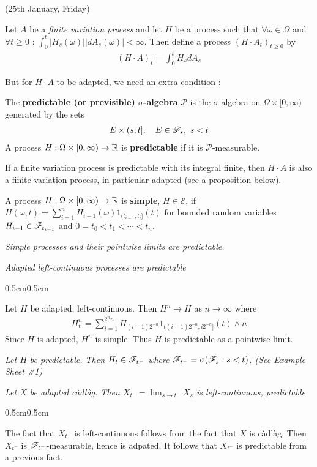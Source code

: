 \documentclass[12pt,a4paper]{article}
\newenvironment{proof}
{\begin{changemargin}{0.5cm}{0.5cm} 
	}%
	{\end{changemargin}
}
\begin{document}
\newday

(25th January, Friday)
\s

 Let $A$ be a \emph{finite variation process} and let $H$ be a process such that $\forall \omega \in \Omega$ and $\forall t\geq 0$ : $\int_0^t |H_s(\omega)| |dA_s(\omega)|<\infty$. Then define a process $(H \cdot A_t)_{t\geq 0}$ by
\begin{align*}
(H\cdot A)_t = \int_0^t H_s dA_s
\end{align*}
\s

But for $H\cdot A$ to be adapted, we need an extra condition :
\s

 The \textbf{predictable (or previsible) $\sigma$-algebra} $\mathscr{P}$ is the $\sigma$-algebra on $\Omega \times [0, \infty)$ generated by the sets
\begin{align*}
E \times (s,t], \quad E\in \mathscr{F}_s, \,\, s<t
\end{align*}
A process $H : \Omega \times [0, \infty) \rightarrow \mathbb{R}$ is \textbf{predictable} if it is $\mathscr{P}$-measurable.

\quad If a finite variation process is predictable with its integral finite, then $H\cdot A$ is also a finite variation process, in particular adapted (see a proposition below).
\s

 A process $H: \Omega \times [0, \infty) \rightarrow \mathbb{R}$ is \textbf{simple}, $H\in \mathscr{E}$, if $H(\omega, t) = \sum_{i=1}^n H_{i-1}(\omega) 1_{(t_{i-1}, t_{i}]}(t)$ for bounded random variables $H_{i-1} \in \mathscr{F}_{t_{i-1}}$ and $0 =t_0 < t_1 < \cdots < t_n$.
\s

\fact \emph{Simple processes and their pointwise limits are predictable.}
\s

\fact \emph{Adapted left-continuous processes are predictable}
\begin{proof}
\pf Let $H$ be adapted, left-continuous. Then $H^n \rightarrow H$ as $n\rightarrow \infty$ where
\begin{align*}
H_t^n = \sum_{i=1}^{2^n n} H_{(i-1)2^{-n}} 1_{((i-1)2^{-n}, i2^{-n}]}(t) \wedge n
\end{align*}
Since $H$ is adapted, $H^n$ is simple. Thus $H$ is predictable as a pointwise limit.

\eop 
\end{proof}
\s

\fact \emph{Let $H$ be predictable. Then $H_t \in \mathscr{F}_{t^-}$ where $\mathscr{F}_{t^{-}} = \sigma(\mathscr{F}_s : s< t)$. (See Example Sheet \#1)}
\s

\fact \emph{Let $X$ be adapted c\`adl\`ag. Then $X_{t^-} = \lim_{s\rightarrow t^-} X_s$ is left-continuous, predictable.}
\begin{proof}
\pf The fact that $X_{t^{-}}$ is left-continuous follows from the fact that $X$ is c\`adl\`ag. Then $X_{t^-}$ is $\mathscr{F}_{t^-}$-measurable, hence is adpated. It follows that $X_{t^-}$ is predictable from a previous fact.
\end{proof}
\s
\end{document}
